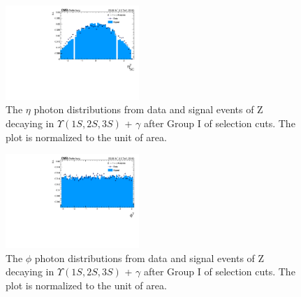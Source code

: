 \begin{figure}[!htbp]
\begin{center}
\includegraphics[width=0.45\textwidth]{figures_and_tables/outputPlots/ZtoUpsilon_Cat0_ZZZZZ/au/data_x_mc/noKinCuts/h_noKin_Photon_eta}\hspace*{1.cm}
\end{center}\vspace*{-.5cm}
\caption{The $\eta$ photon distributions from data and signal events of Z decaying in $\Upsilon(1S,2S,3S)$ + $\gamma$ after Group I of selection cuts. The plot is normalized to the unit of area.}
\label{fig:etaPhoton_ZtoUpsilon_Cat0}
\end{figure}

\begin{figure}[!htbp]
\begin{center}
\includegraphics[width=0.45\textwidth]{figures_and_tables/outputPlots/ZtoUpsilon_Cat0_ZZZZZ/au/data_x_mc/noKinCuts/h_noKin_Photon_phi}\hspace*{1.cm}
\end{center}\vspace*{-.5cm}
\caption{The $\phi$ photon distributions from data and signal events of Z decaying in $\Upsilon(1S,2S,3S)$ + $\gamma$ after Group I of selection cuts. The plot is normalized to the unit of area.}
\label{fig:phiPhoton_ZtoUpsilon_Cat0}
\end{figure}

